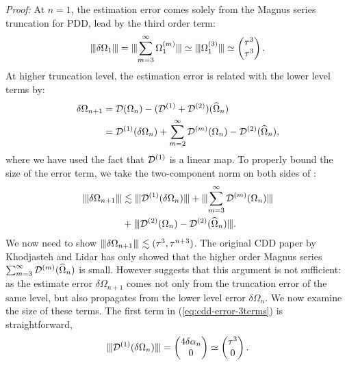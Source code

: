 \documentclass[pra,reprint,superscriptaddress]{revtex4-2}
\begin{document}
\emph{Proof:}
At $n=1$, the estimation error comes solely from the Magnus series truncation for PDD, lead by the third order term:
\begin{equation}
\opnorm{\delta\Omega_{1}} = \opnorm{\sum_{m=3}^\infty \Omega_{1}\up{m}}
\simeq \opnorm{\Omega_{1}\up{3}} \simeq
\begin{pmatrix}
\tau^3\\
\tau^3
\end{pmatrix}.
\end{equation}
At higher truncation level, the estimation error is related with the lower level terms by:
\begin{equation}\label{eq:error update}
 \begin{aligned}
\delta\Omega_{n+1} 
&=\mathcal{D}(\Omega_{n})-(\mathcal{D}^{(1)}+\mathcal{D}^{(2)})(\widehat{\Omega}_{n})\\
&= \mathcal{D}^{(1)}(\delta\Omega_{n})+ \sum_{m=2}^\infty \mathcal{D}^{(m)}(\Omega_{n})-\mathcal{D}^{(2)}(\widehat{\Omega}_{n}),
\end{aligned} 
\end{equation}
where we have used the fact that $\mathcal{D}^{(1)}$ is a linear map. 
To properly bound the size of the error term, we take the two-component norm on both sides of :
\begin{equation}
\begin{aligned}\label{eq:cdd-error-3terms}
\opnorm{\delta\Omega_{n+1} }
&\lesssim \opnorm{ \cD\up{1}(\delta\Omega_{n}) } + 
\opnorm{\sum_{m=3}^\infty \cD\up{m}( \Omega_{n})} \\
&+ \opnorm{ \cD\up{2}(\Omega_n)-\cD\up{2}(\Ohat_{n})}.
\end{aligned}    
\end{equation}
We now need to show $\opnorm{\delta\Omega_{n+1}}\lesssim(\tau^3,\tau^{n+3})$.
The original CDD paper by Khodjasteh and Lidar has only showed that the higher order Magnus series $\sum_{m=3}^\infty\mathcal{D}^{(m)}(\widehat{\Omega}_{n})$ is small.
However  suggests that this argument is not sufficient: as
the estimate error $\delta\Omega_{n+1}$ comes not only  from the truncation error of the same level, but also propagates from the lower level error $\delta\Omega_{n}$. 
We now examine the size of these terms.
The first term in (\ref{eq:cdd-error-3terms}) is straightforward,
\begin{equation*}
\opnorm{\cD\up{1}(\delta\Omega_{n})} = \begin{pmatrix}
4 \delta\alpha_{n} \\
0
\end{pmatrix}\simeq
\begin{pmatrix}
\tau^3 \\
0
\end{pmatrix}.
\end{equation*}
\end{document}
